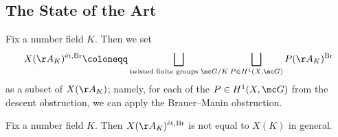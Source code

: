 \documentclass[../notes.tex]{subfiles}
\begin{document}
\subsection{The State of the Art}
Fix a number field $K$. Then we set
\[X(\AA_K)^{\mathrm{\acute et},\mathrm{Br}}\coloneqq\bigsqcup_{\text{twisted finite groups }\mc G/K}\bigsqcup_{P\in H^1(X,\mc G)}P(\AA_K)^{\mathrm{Br}}\]
as a subset of $X(\AA_K)$; namely, for each of the $P\in H^1(X,\mc G)$ from the descent obstruction, we can apply the Brauer--Manin obstruction.
\begin{theorem}[Poonen]
	Fix a number field $K$. Then $X(\AA_K)^{\mathrm{\acute et},\mathrm{Br}}$ is not equal to $X(K)$ in general.
\end{theorem}
\end{document}
